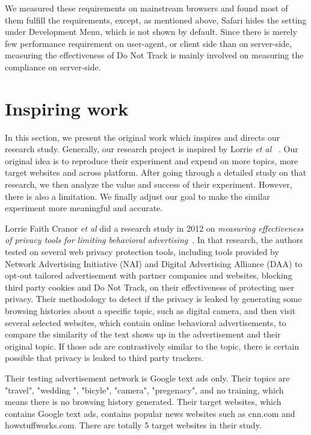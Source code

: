 \documentclass{sig-alternate}
\begin{document}
We measured these requirements on mainstream browsers and found most of them fulfill the requirements, except, as mentioned above, Safari hides the setting under Development Menu, which is not shown by default. Since there is merely few performance requirement on user-agent, or client side than on server-side, measuring the effectiveness of Do Not Track is mainly involved on measuring the compliance on server-side. 


\section{Inspiring work} \label{sec:lorrie}

In this section, we present the original work which inspires and directs our research study. Generally, our research project is inspired by Lorrie \emph{et al} ~\cite{balebako2012measuring}. Our original idea is to reproduce their experiment and expend on more topics, more target websites and across platform. After going through a detailed study on that research, we then analyze the value and success of their experiment. However, there is also a limitation. We finally adjust our goal to make the similar experiment more meaningful and accurate.

Lorrie Faith Cranor \emph{et al} did a research study in 2012 on \emph{measuring effectiveness of privacy tools for limiting behavioral advertising}~\cite{balebako2012measuring}. In that research, the authors tested on several web privacy protection tools, including tools provided by Network Advertising Initiative (NAI) and Digital Advertising Alliance (DAA) to opt-out tailored advertisement with partner companies and websites, blocking third party cookies and Do Not Track, on their effectiveness of protecting user privacy. Their methodology to detect if the privacy is leaked by generating some browsing histories about a specific topic, such as digital camera, and then visit several selected websites, which contain online behavioral advertisements, to compare the similarity of the text shows up in the advertisement and their original topic. If those ads are contrastively similar to the topic, there is certain possible that privacy is leaked to third party trackers.

Their testing advertisement network is Google text ads only. Their topics are "travel", "wedding ", "bicyle", "camera", "pregenacy", and no training, which means there is no browsing history generated. Their target websites, which contains Google text ads, contains popular news websites such as cnn.com and howstuffworks.com. There are totally 5 target websites in their study.
\end{document}
